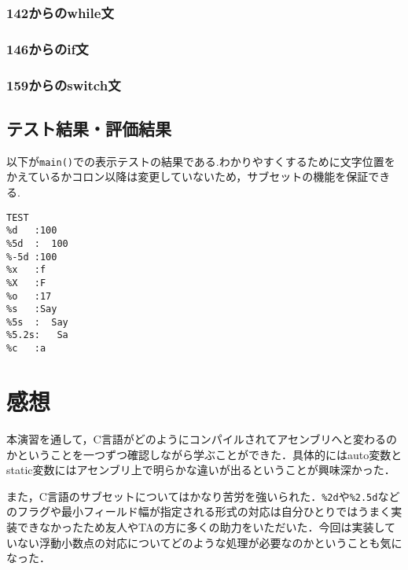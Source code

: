 \documentclass[a4j,11pt]{jarticle}
\begin{document}
\subsubsection{142からのwhile文}
\subsubsection{146からのif文}
\subsubsection{159からのswitch文}
  \subsection{テスト結果・評価結果}
以下が\verb|main()|での表示テストの結果である.わかりやすくするために文字位置をかえているかコロン以降は変更していないため，サブセットの機能を保証できる.
\begin{verbatim}
TEST
%d   :100
%5d  :  100
%-5d :100  
%x   :f
%X   :F
%o   :17
%s   :Say
%5s  :  Say
%5.2s:   Sa
%c   :a
\end{verbatim}

\section{感想}
本演習を通して，C言語がどのようにコンパイルされてアセンブリへと変わるのかということを一つずつ確認しながら学ぶことができた．具体的にはauto変数とstatic変数にはアセンブリ上で明らかな違いが出るということが興味深かった．

また，C言語のサブセットについてはかなり苦労を強いられた．\verb|%2d|や\verb|%2.5d|などのフラグや最小フィールド幅が指定される形式の対応は自分ひとりではうまく実装できなかったため友人やTAの方に多くの助力をいただいた．今回は実装していない浮動小数点の対応についてどのような処理が必要なのかということも気になった．
\end{document}
